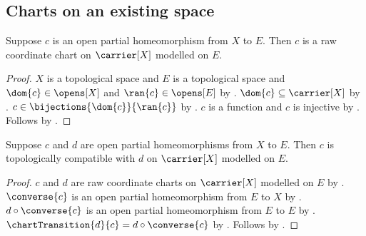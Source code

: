 \subsection{Charts on an existing space}

\begin{theorem}\label{open_partial_homeomorphism_is_raw_chart}
    Suppose $c$ is an open partial homeomorphism from $X$ to $E$.
    Then $c$ is a raw coordinate chart on $\carrier[X]$ modelled on $E$.
\end{theorem}
\begin{proof}
    $X$ is a topological space and $E$ is a topological space and
        $\dom{c}\in\opens[X]$ and $\ran{c}\in\opens[E]$ by
        .
    $\dom{c}\subseteq\carrier[X]$ by .
    $c\in\bijections{\dom{c}}{\ran{c}}$ by
        .
    $c$ is a function and $c$ is injective by
        .
    Follows by .
\end{proof}

\begin{theorem}\label{open_partial_homeomorphisms_are_compatible}
    Suppose $c$ and $d$ are open partial homeomorphisms from $X$ to $E$.
    Then $c$ is topologically compatible with $d$ on $\carrier[X]$
        modelled on $E$.
\end{theorem}
\begin{proof}
    $c$ and $d$ are raw coordinate charts on $\carrier[X]$ modelled on $E$
        by .
    $\converse{c}$ is an open partial homeomorphism from $E$ to $X$ by
        .
    $d\circ\converse{c}$ is an open partial homeomorphism from $E$ to $E$ by
        .
    $\chartTransition{d}{c}=d\circ\converse{c}$ by .
    Follows by .
\end{proof}
